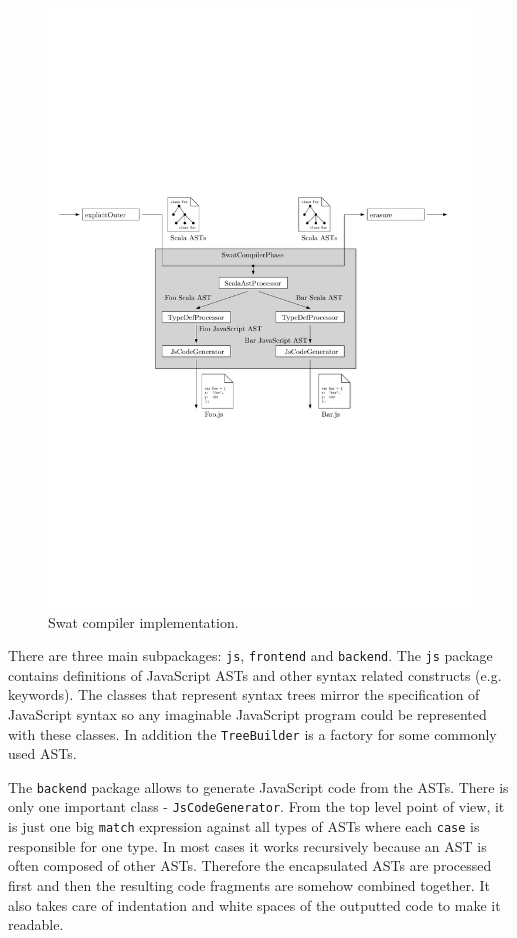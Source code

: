 \documentclass[12pt,a4paper]{report}
\begin{document}
\begin{figure}[ht]
  \centering
	\includegraphics[width=\linewidth,height=\textheight,keepaspectratio]{img/SwatCompiler.pdf}
	\caption{Swat compiler implementation.}
	\label{SwatCompiler}
\end{figure}

There are three main subpackages: \texttt{js}, \texttt{frontend} and \texttt{backend}. The \texttt{js} package contains definitions of JavaScript ASTs and other syntax related constructs (e.g. keywords). The classes that represent syntax trees mirror the specification of JavaScript syntax \cite{EcmaScript} so any imaginable JavaScript program could be represented with these classes. In addition the \texttt{TreeBuilder} is a factory for some commonly used ASTs.

The \texttt{backend} package allows to generate JavaScript code from the ASTs. There is only one important class - \texttt{JsCodeGenerator}. From the top level point of view, it is just one big \texttt{match} expression against all types of ASTs where each \texttt{case} is responsible for one type. In most cases it works recursively because an AST is often composed of other ASTs. Therefore the encapsulated ASTs are processed first and then the resulting code fragments are somehow combined together. It also takes care of indentation and white spaces of the outputted code to make it readable.
\end{document}
